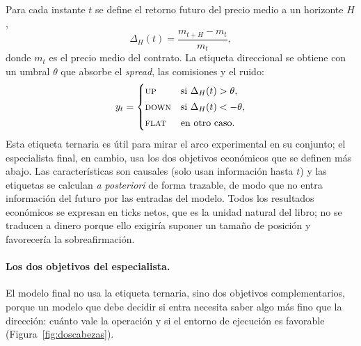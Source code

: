 Para cada instante $t$ se define el retorno futuro del precio medio a un horizonte $H$,
\begin{equation}
\Delta_H(t) = \frac{m_{t+H} - m_t}{m_t},
\end{equation}
donde $m_t$ es el precio medio del contrato. La etiqueta direccional se obtiene con un
umbral $\theta$ que absorbe el \emph{spread}, las comisiones y el ruido:
\begin{equation}
y_t = \begin{cases}
\textsc{up} & \text{si } \Delta_H(t) > \theta,\\[2pt]
\textsc{down} & \text{si } \Delta_H(t) < -\theta,\\[2pt]
\textsc{flat} & \text{en otro caso.}
\end{cases}
\end{equation}
Esta etiqueta ternaria es útil para mirar el arco experimental en su conjunto; el
especialista final, en cambio, usa los dos objetivos económicos que se definen más abajo.
Las características son causales (solo usan información hasta
$t$) y las etiquetas se calculan \emph{a posteriori} de forma trazable, de modo que no
entra información del futuro por las entradas del modelo. Todos los resultados económicos se
expresan en ticks netos, que es la unidad natural del libro; no se traducen a dinero porque
ello exigiría suponer un tamaño de posición y favorecería la sobreafirmación.

\paragraph{Los dos objetivos del especialista.} El modelo final no usa la etiqueta ternaria,
sino dos objetivos complementarios, porque un modelo que debe decidir si entra necesita
saber algo más fino que la dirección: cuánto vale la operación y si el entorno de ejecución
es favorable (Figura~\ref{fig:doscabezas}).

